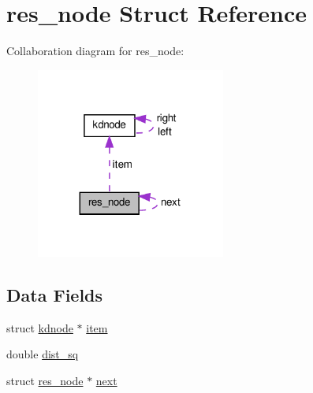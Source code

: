 \hypertarget{a00012}{\section{res\-\_\-node \-Struct \-Reference}
\label{df/d86/a00012}
}


\-Collaboration diagram for res\-\_\-node\-:\nopagebreak
\begin{figure}[H]
\begin{center}
\leavevmode
\includegraphics[width=176pt]{dd/d32/a00041}
\end{center}
\end{figure}
\subsection*{\-Data \-Fields}
\begin{DoxyCompactItemize}
\item 
struct \hyperlink{a00009}{kdnode} $\ast$ \hyperlink{a00012_a9839da196515787759722e34b14a2d3f_a9839da196515787759722e34b14a2d3f}{item}
\item 
double \hyperlink{a00012_ab5db408f198264d49229dc7119b5a259_ab5db408f198264d49229dc7119b5a259}{dist\-\_\-sq}
\item 
struct \hyperlink{a00012}{res\-\_\-node} $\ast$ \hyperlink{a00012_a4a322132f093f66e895e0b5f5ee1bfea_a4a322132f093f66e895e0b5f5ee1bfea}{next}
\end{DoxyCompactItemize}


